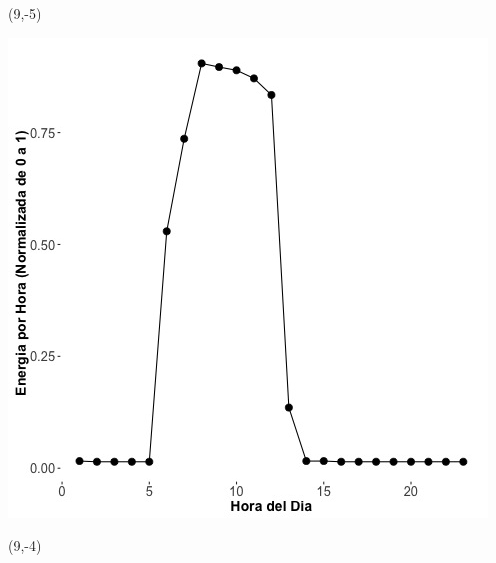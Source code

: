 \documentclass{article}\usepackage[]{graphicx}\usepackage[]{color}
\newenvironment{knitrout}{}{} %
\begin{document}
 \begin{textblock}{1}(9,-5)
\begin{minipage}{20em}
\begingroup

\endgroup
\end{minipage}
\end{textblock}

\begin{knitrout}
\color{fgcolor}
\includegraphics[scale=0.65]{figure/A28_plot_norm_median} 
\end{knitrout}


 \begin{textblock}{1}(9,-4)
\begin{minipage}{20em}
\begingroup

\endgroup
\end{minipage}
\end{textblock}
\end{document}
